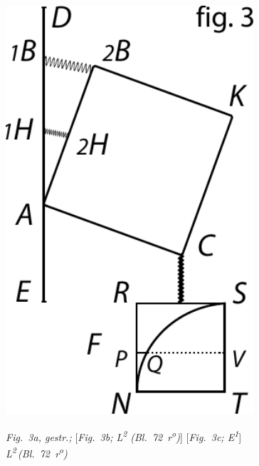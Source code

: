 \begin{minipage}[t][5.8cm][b]{0.33\textwidth}
\includegraphics[width=0.69\textwidth]{gesamttex/edit_VIII,3/images/dnr-3c_AE_1684_319-325_d3c.pdf}
\end{minipage}\vspace{1.5em}
\pend\vspace{0.7em}
\pstart
\noindent{}
\hspace*{2mm} \lbrack\textit{Fig.~3a, gestr.;}\hspace*{19mm} [\textit{Fig.~3b; L\textsuperscript{2}\! (Bl.~72~r\textsuperscript{o}\!)}]\label{AE_1684_321_Fig_3b}\hspace*{19mm} [\textit{Fig.~3c; E\textsuperscript{1}}]\label{AE_1684_321_Fig_3c}
\\
\hspace*{5mm} \textit{L\textsuperscript{2}\,(Bl.~72~r\textsuperscript{o}\!)}\rbrack
\pend
\vspace{-2mm}
\newpage
\count{}
\count{}
\count{}
